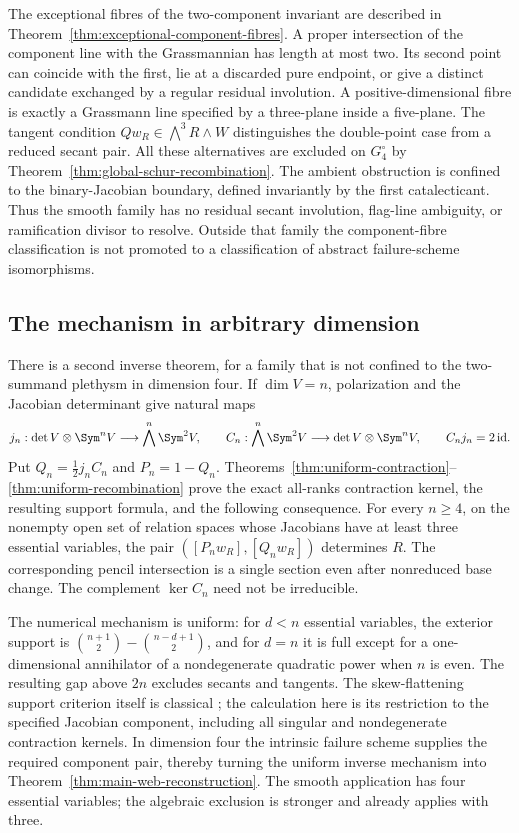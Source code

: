 The exceptional fibres of the two-component invariant are described in
Theorem~\ref{thm:exceptional-component-fibres}.  A proper intersection
of the component line with the Grassmannian has length at most two.
Its second point can coincide with the first, lie at a discarded pure
endpoint, or give a distinct candidate exchanged by a regular residual
involution.  A positive-dimensional fibre is exactly a Grassmann line
specified by a three-plane inside a five-plane.  The tangent condition
\(Qw_R\in\bigwedge^3R\wedge W\) distinguishes the double-point
case from a reduced secant pair.  All these alternatives are excluded on \(G_4^\circ\) by
Theorem~\ref{thm:global-schur-recombination}.  The ambient obstruction
is confined to the binary-Jacobian boundary, defined invariantly by the
first catalecticant.  Thus the smooth family has no residual secant
involution, flag-line ambiguity, or ramification divisor to resolve.
Outside that family the component-fibre classification is not promoted
to a classification of abstract failure-scheme isomorphisms.


\subsection{The mechanism in arbitrary dimension}

There is a second inverse theorem, for a family that is not confined
to the two-summand plethysm in dimension four.  If \(\dim V=n\),
polarization and the Jacobian determinant give natural maps
\[
 j_n:\det V\otimes\Sym^nV\longrightarrow\bigwedge^n\Sym^2V,
 \qquad C_n:\bigwedge^n\Sym^2V\longrightarrow\det V\otimes\Sym^nV,
 \qquad C_nj_n=2\,\mathrm{id}.
\]
Put \(Q_n=\frac12j_nC_n\) and \(P_n=1-Q_n\).
Theorems~\ref{thm:uniform-contraction}--\ref{thm:uniform-recombination}
prove the exact all-ranks contraction kernel, the resulting support
formula, and the following consequence.  For every \(n\ge4\), on
the nonempty open set of relation spaces whose Jacobians have at
least three essential variables, the pair
\(([P_nw_R],[Q_nw_R])\) determines \(R\).  The corresponding
pencil intersection is a single section even after nonreduced base
change.  The complement \(\ker C_n\) need not be irreducible.

The numerical mechanism is uniform: for \(d<n\) essential variables,
the exterior support is
\(\binom{n+1}{2}-\binom{n-d+1}{2}\), and for \(d=n\) it is full
except for a one-dimensional annihilator of a nondegenerate quadratic
power when \(n\) is even.  The resulting gap above \(2n\) excludes
secants and tangents.  The skew-flattening support criterion itself
is classical \cite{LandsbergOttaviani,Sheridan}; the calculation here
is its restriction to the specified Jacobian component, including
all singular and nondegenerate contraction kernels.  In dimension
four the intrinsic failure scheme supplies the required component
pair, thereby turning the uniform inverse mechanism into
Theorem~\ref{thm:main-web-reconstruction}.  The smooth application
has four essential variables; the algebraic exclusion is stronger
and already applies with three.

